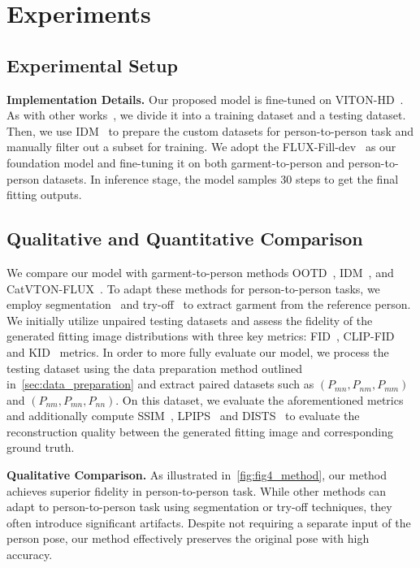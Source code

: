 \section{Experiments}
\label{sec:experiment}

\subsection{Experimental Setup}\label{sec:exp_set}
\noindent \textbf{Implementation Details.} 
Our proposed model is fine-tuned on VITON-HD~\cite{choi2021viton}. As with other works~\cite{xu2024ootdiffusion,choi2024improving,velioglu2024tryoffdiff}, we divide it into a training dataset and a testing dataset. Then, we use IDM~\cite{choi2024improving} to prepare the custom datasets for person-to-person task and manually filter out a subset for training. We adopt the FLUX-Fill-dev~\cite{flux} as our foundation model and fine-tuning it on both garment-to-person and person-to-person datasets. In inference stage, the model samples 30 steps to get the final fitting outputs.

\subsection{Qualitative and Quantitative Comparison}\label{sec:exp_comp}
We compare our model with garment-to-person methods OOTD~\cite{xu2024ootdiffusion}, IDM~\cite{choi2024improving}, and CatVTON-FLUX~\cite{catvton-flux}. To adapt these methods for person-to-person tasks, we employ segmentation~\cite{ravi2024sam} and try-off~\cite{velioglu2024tryoffdiff} to extract garment from the reference person. We initially utilize unpaired testing datasets and assess the fidelity of the generated fitting image distributions with three key metrics: FID~\cite{heusel2017gans}, CLIP-FID~\cite{kynkaanniemi2022role} and KID~\cite{binkowski2018demystifying} metrics. In order to more fully evaluate our model, we process the testing dataset using the data preparation method outlined in~\cref{sec:data_preparation} and extract paired datasets such as $\left(P_{mn}, P_{nm}, P_{mm}\right)$ and $\left(P_{nm}, P_{mn}, P_{nn}\right)$. On this dataset, we evaluate the aforementioned metrics and additionally compute SSIM~\cite{wang2004image}, LPIPS~\cite{zhang2018unreasonable} and DISTS~\cite{ding2020image} to evaluate the reconstruction quality between the generated fitting image and corresponding ground truth.


\noindent \textbf{Qualitative Comparison.}
As illustrated in~\cref{fig:fig4_method}, our method achieves superior fidelity in person-to-person task. While other methods can adapt to person-to-person task using segmentation or try-off techniques, they often introduce significant artifacts. Despite not requiring a separate input of the person pose, our method effectively preserves the original pose with high accuracy.


